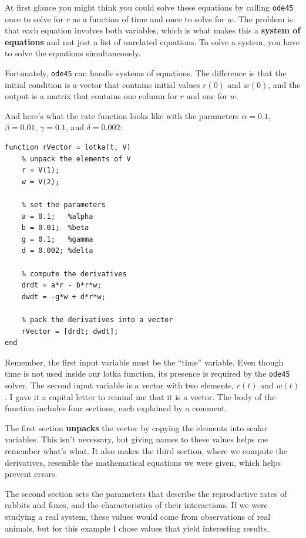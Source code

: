 \documentclass[
]{book}
\begin{document}
At first glance you might think you could solve these equations by
calling {\tt ode45} once to solve for $r$ as a function of time and
once to solve for $w$.  The problem is that each equation involves
both variables, which is what makes this a {\bf system of equations}
and not just a list of unrelated equations.  To solve a system, you
have to solve the equations simultaneously.

Fortunately, {\tt ode45} can handle systems of equations.  The
difference is that the initial condition is a vector that contains
initial values $r(0)$ and $w(0)$, and the output is a matrix
that contains one column for $r$ and one for $w$.

And here's what the rate function looks like
with the parameters $\alpha = 0.1$, $\beta = 0.01$, $\gamma = 0.1$, and $\delta = 0.002$:

\begin{verbatim}
function rVector = lotka(t, V)
    % unpack the elements of V
    r = V(1);
    w = V(2);

    % set the parameters
    a = 0.1;   %alpha
    b = 0.01;  %beta
    g = 0.1;   %gamma
    d = 0.002; %delta

    % compute the derivatives
    drdt = a*r - b*r*w;
    dwdt = -g*w + d*r*w;

    % pack the derivatives into a vector
    rVector = [drdt; dwdt];
end
\end{verbatim}

Remember, the first input variable must be the ``time'' variable.
Even though time 
is not used inside our lotka function, its presence is required by 
the {\tt ode45} solver.
The second input variable is a vector with two elements,
$r(t)$ and $w(t)$.  I gave it a capital letter to remind me that it
is a vector.  The body of the function includes four sections,
each explained by a comment.

The first section {\bf unpacks} the vector by copying the elements
into scalar variables.  This isn't necessary, but giving names to
these values helps me remember what's what.  It also makes the third
section, where we compute the derivatives, resemble the mathematical
equations we were given, which helps prevent errors.

The second section sets the parameters that describe the
reproductive rates of rabbits and foxes, and the characteristics of
their interactions.  If we were studying a real system, these values
would come from observations of real animals, but for this example
I chose values that yield interesting results.
\end{document}
